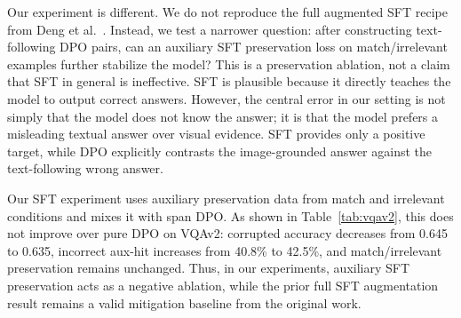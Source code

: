 Our experiment is different.
We do not reproduce the full augmented SFT recipe from Deng et al.~\cite{deng2025words}.
Instead, we test a narrower question: after constructing text-following DPO pairs, can an auxiliary SFT preservation loss on match/irrelevant examples further stabilize the model?
This is a preservation ablation, not a claim that SFT in general is ineffective.
SFT is plausible because it directly teaches the model to output correct answers.
However, the central error in our setting is not simply that the model does not know the answer; it is that the model prefers a misleading textual answer over visual evidence.
SFT provides only a positive target, while DPO explicitly contrasts the image-grounded answer against the text-following wrong answer.

Our SFT experiment uses auxiliary preservation data from match and irrelevant conditions and mixes it with span DPO.
As shown in Table~\ref{tab:vqav2}, this does not improve over pure DPO on VQAv2: corrupted accuracy decreases from 0.645 to 0.635, incorrect aux-hit increases from 40.8\% to 42.5\%, and match/irrelevant preservation remains unchanged.
Thus, in our experiments, auxiliary SFT preservation acts as a negative ablation, while the prior full SFT augmentation result remains a valid mitigation baseline from the original work.

